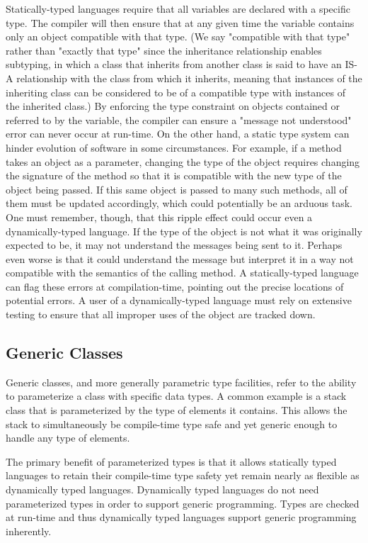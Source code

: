 \documentclass[12pt,a4paper,final,twoside,onecolumn,titlepage]{book}
\begin{document}
Statically-typed languages require that all variables are declared with a specific type. The compiler will then ensure that at any given time the variable contains only an object compatible with that type. (We say "compatible with that type" rather than "exactly that type" since the inheritance relationship enables subtyping, in which a class that inherits from another class is said to have an IS-A relationship with the class from which it inherits, meaning that instances of the inheriting class can be considered to be of a compatible type with instances of the inherited class.) By enforcing the type constraint on objects contained or referred to by the variable, the compiler can ensure a "message not understood" error can never occur at run-time. On the other hand, a static type system can hinder evolution of software in some circumstances. For example, if a method takes an object as a parameter, changing the type of the object requires changing the signature of the method so that it is compatible with the new type of the object being passed. If this same object is passed to many such methods, all of them must be updated accordingly, which could potentially be an arduous task. One must remember, though, that this ripple effect could occur even a dynamically-typed language. If the type of the object is not what it was originally expected to be, it may not understand the messages being sent to it. Perhaps even worse is that it could understand the message but interpret it in a way not compatible with the semantics of the calling method. A statically-typed language can flag these errors at compilation-time, pointing out the precise locations of potential errors. A user of a dynamically-typed language must rely on extensive testing to ensure that all improper uses of the object are tracked down.

\subsection{Generic Classes}
Generic classes, and more generally parametric type facilities, refer to the ability to parameterize a class with specific data types. A common example is a stack class that is parameterized by the type of elements it contains. This allows the stack to simultaneously be compile-time type safe and yet generic enough to handle any type of elements.

The primary benefit of parameterized types is that it allows statically typed languages to retain their compile-time type safety yet remain nearly as flexible as dynamically typed languages. Dynamically typed languages do not need parameterized types in order to support generic programming. Types are checked at run-time and thus dynamically typed languages support generic programming inherently.
\end{document}
